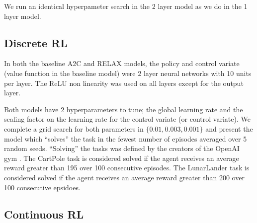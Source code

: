 \documentclass{article}
\begin{document}
We run an identical hyperpameter search in the 2 layer model as we do in the 1 layer model. 


\subsection{Discrete RL}
In both the baseline A2C and RELAX models, the policy and control variate (value function in the baseline model) were 2 layer neural networks with 10 units per layer. The ReLU non linearity was used on all layers except for the output layer.

Both models have 2 hyperparameters to tune; the global learning rate and the scaling factor on the learning rate for the control variate (or control variate). We complete a grid search for both parameters in $\{0.01, 0.003, 0.001\}$ and present the model which ``solves'' the task in the fewest number of episodes averaged over 5 random seeds. ``Solving'' the tasks was defined by the creators of the OpenAI gym \cite{1606.01540}. The CartPole task is considered solved if the agent receives an average reward greater than 195 over 100 consecutive episodes. The LunarLander task is considered solved if the agent receives an average reward greater than 200 over 100 consecutive epsidoes. 
\subsection{Continuous RL}
\end{document}
